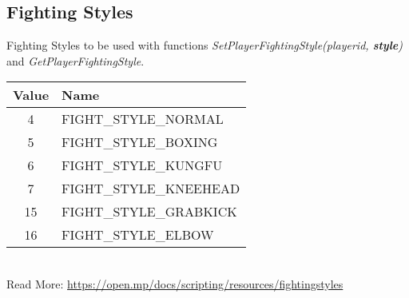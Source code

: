\documentclass{article}
\begin{document}
\subsection{Fighting Styles}
\begin{sloppypar}
Fighting Styles to be used with functions \textit{SetPlayerFightingStyle(playerid, \textbf{style})} and \textit{GetPlayerFightingStyle}.
\end{sloppypar}
\bigskip
\noindent\begin{tabular}{ |c|l| } 
\hline
Value & Name \\
\hline
4 & FIGHT\_STYLE\_NORMAL \\
5 & FIGHT\_STYLE\_BOXING \\
6 & FIGHT\_STYLE\_KUNGFU \\
7 & FIGHT\_STYLE\_KNEEHEAD \\
15 & FIGHT\_STYLE\_GRABKICK \\
16 & FIGHT\_STYLE\_ELBOW \\
\hline
\end{tabular}
\bigskip
\\Read More: \url{https://open.mp/docs/scripting/resources/fightingstyles}


\newpage
\end{document}
